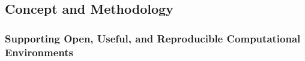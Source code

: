 
\subsection{Concept and Methodology}\label{sec:concept_methodology}


%
%
%
%

\subsubsection{Supporting Open, Useful, and Reproducible Computational
  Environments}\label{sec:SOURCE}

